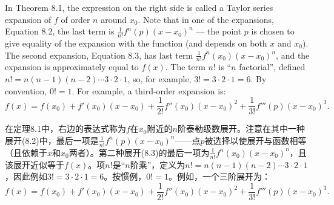 \begin{original}
In Theorem 8.1, the expression on the right side is called a Taylor series expansion of $f$ of order $n$ around $x_0$. Note that in one of the expansions, Equation 8.2, the last term is $\frac{1}{n!}f^n(p)(x - x_0)^n$ --- the point $p$ is chosen to give equality of the expansion with the function (and depends on both $x$ and $x_0$). The second expansion, Equation 8.3, has last term $\frac{1}{n!}f^n(x_0)(x - x_0)^n$, and the expansion is approximately equal to $f(x)$. The term $n!$ is ``$n$ factorial'', defined $n! = n(n-1)(n-2)\cdots 3 \cdot 2 \cdot 1$, so, for example, $3! = 3 \cdot 2 \cdot 1 = 6$. By convention, $0! = 1$. For example, a third-order expansion is:
\[
f(x) = f(x_0) + f'(x_0)(x - x_0) + \frac{1}{2!}f''(x_0)(x - x_0)^2 + \frac{1}{3!}f'''(p)(x - x_0)^3.
\]
\end{original}
\begin{translation}
在定理8.1中，右边的表达式称为$f$在$x_0$附近的$n$阶泰勒级数展开。注意在其中一种展开(8.2)中，最后一项是$\frac{1}{n!}f^n(p)(x - x_0)^n$——点$p$被选择以使展开与函数相等（且依赖于$x$和$x_0$两者）。第二种展开(8.3)的最后一项为$\frac{1}{n!}f^n(x_0)(x - x_0)^n$，且该展开近似等于$f(x)$。项$n!$是``$n$阶乘''，定义为$n! = n(n-1)(n-2)\cdots 3 \cdot 2 \cdot 1$，因此例如$3! = 3 \cdot 2 \cdot 1 = 6$。按惯例，$0! = 1$。例如，一个三阶展开为：
\[
f(x) = f(x_0) + f'(x_0)(x - x_0) + \frac{1}{2!}f''(x_0)(x - x_0)^2 + \frac{1}{3!}f'''(p)(x - x_0)^3.
\]
\end{translation}

